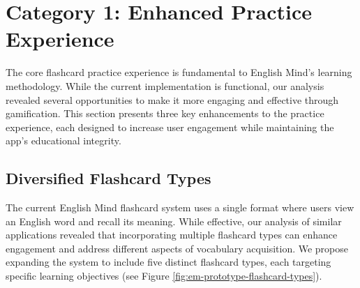 \section{Category 1: Enhanced Practice Experience}
\label{sec:em-gamification-practice-experience}
The core flashcard practice experience is fundamental to English Mind's learning methodology. While the current implementation is functional, our analysis revealed several opportunities to make it more engaging and effective through gamification. This section presents three key enhancements to the practice experience, each designed to increase user engagement while maintaining the app's educational integrity.

\subsection{Diversified Flashcard Types}

The current English Mind flashcard system uses a single format where users view an English word and recall its meaning. While effective, our analysis of similar applications revealed that incorporating multiple flashcard types can enhance engagement and address different aspects of vocabulary acquisition. We propose expanding the system to include five distinct flashcard types, each targeting specific learning objectives (see Figure \ref{fig:em-prototype-flashcard-types}).

